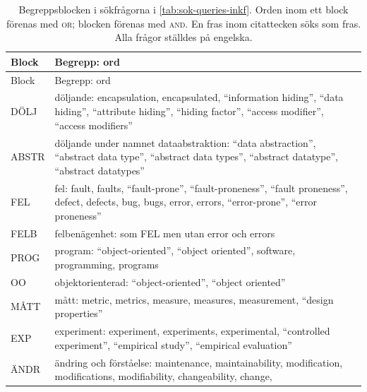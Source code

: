 \begingroup\footnotesize
\begin{longtable}{@{}>{\raggedright\arraybackslash}p{}%
  >{\raggedright\arraybackslash}p{}@{}}
  \caption{Begreppsblocken i sökfrågorna i
    \cref{tab:sok-queries-inkf}.  Orden inom ett block förenas med
    \textsc{or}; blocken förenas med \textsc{and}.  En fras inom
    citattecken söks som fras.  Alla frågor ställdes på engelska.}
  \label{tab:sok-begrepp-inkf}\\
  \toprule
  Block & Begrepp: ord \\
  \midrule
  \endfirsthead
  \toprule
  Block & Begrepp: ord \\
  \midrule
  \endhead
  \bottomrule
  \endfoot
  DÖLJ & döljande: encapsulation, encapsulated, \enquote{information
    hiding}, \enquote{data hiding}, \enquote{attribute hiding},
    \enquote{hiding factor}, \enquote{access modifier}, \enquote{access
    modifiers} \\
  ABSTR & döljande under namnet dataabstraktion: \enquote{data
    abstraction}, \enquote{abstract data type}, \enquote{abstract data
    types}, \enquote{abstract datatype}, \enquote{abstract datatypes} \\
  FEL & fel: fault, faults, \enquote{fault-prone},
    \enquote{fault-proneness}, \enquote{fault proneness}, defect, defects,
    bug, bugs, error, errors, \enquote{error-prone}, \enquote{error
    proneness} \\
  FELB & felbenägenhet: som FEL men utan error och errors \\
  PROG & program: \enquote{object-oriented}, \enquote{object oriented},
    software, programming, programs \\
  OO & objektorienterad: \enquote{object-oriented}, \enquote{object
    oriented} \\
  MÅTT & mått: metric, metrics, measure, measures, measurement,
    \enquote{design properties} \\
  EXP & experiment: experiment, experiments, experimental,
    \enquote{controlled experiment}, \enquote{empirical study},
    \enquote{empirical evaluation} \\
  ÄNDR & ändring och förståelse: maintenance, maintainability,
    modification, modifications, modifiability, changeability, change,

\end{longtable}
